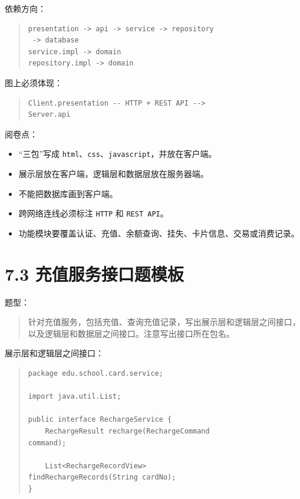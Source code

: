 \documentclass[UTF8,zihao=-4]{ctexart}
\begin{document}
依赖方向：

\begin{quote}
\footnotesize
\begin{verbatim}
presentation -> api -> service -> repository
 -> database
service.impl -> domain
repository.impl -> domain
\end{verbatim}
\end{quote}

图上必须体现：

\begin{quote}
\footnotesize
\begin{verbatim}
Client.presentation -- HTTP + REST API --> 
Server.api
\end{verbatim}
\end{quote}

阅卷点：

\begin{itemize}
\item “三包”写成 \texttt{html}、\texttt{css}、\texttt{javascript}，并放在客户端。
\item 展示层放在客户端，逻辑层和数据层放在服务器端。
\item 不能把数据库画到客户端。
\item 跨网络连线必须标注 \texttt{HTTP} 和 \texttt{REST API}。
\item 功能模块要覆盖认证、充值、余额查询、挂失、卡片信息、交易或消费记录。
\end{itemize}

\section{7.3 充值服务接口题模板}

题型：

\begin{quote}
针对充值服务，包括充值、查询充值记录，写出展示层和逻辑层之间接口，以及逻辑层和数据层之间接口。注意写出接口所在包名。
\end{quote}

展示层和逻辑层之间接口：

\begin{quote}
\footnotesize
\begin{verbatim}
package edu.school.card.service;

import java.util.List;

public interface RechargeService {
    RechargeResult recharge(RechargeCommand 
command);

    List<RechargeRecordView> 
findRechargeRecords(String cardNo);
}
\end{verbatim}
\end{quote}
\end{document}
